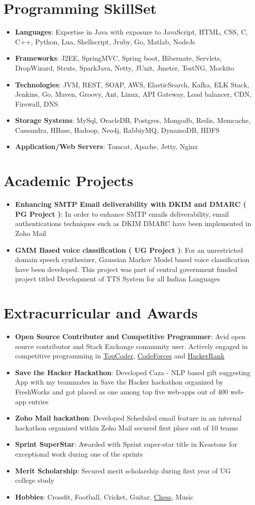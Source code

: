 \documentclass[letterpaper,11pt]{article}
\newcommand{\resumeItem}[2]{
  \item\small{
    \textbf{#1}{: #2 \vspace{-2pt}}
  }
}
\newcommand{\resumeSubItem}[2]{\resumeItem{#1}{#2}\vspace{-4pt}}
\newcommand{\resumeSubHeadingListStart}{\begin{itemize}[leftmargin=*]}
\newcommand{\resumeSubHeadingListEnd}{\end{itemize}}
\begin{document}
\section{Programming SkillSet}
  \resumeSubHeadingListStart
    \resumeSubItem{Languages}{Expertise in Java with exposure to JavaScript, HTML, CSS, C, C++, Python, Lua, Shellscript, Jruby, Go, Matlab, NodeJs}
    \resumeSubItem{Frameworks}{J2EE, SpringMVC, Spring boot, Hibernate, Servlets, DropWizard, Struts, SparkJava, Netty, JUnit, Jmeter, TestNG, Mockito}
    \resumeSubItem{Technologies}{JVM, REST, SOAP, AWS, ElasticSearch, Kafka, ELK Stack, Jenkins, Go, Maven, Groovy, Ant, Linux, API Gateway, Load balancer, CDN, Firewall, DNS}
    \resumeSubItem{Storage Systems}{MySql, OracleDB, Postgres, Mongodb, Redis, Memcache,  Cassandra, HBase, Hadoop, Neo4j, RabbiyMQ, DynamoDB, HDFS}
     \resumeSubItem{Application/Web Servers}{Tomcat, Apache, Jetty, Nginx}
     
  \resumeSubHeadingListEnd


\section{Academic Projects}
  \resumeSubHeadingListStart
    \resumeSubItem{Enhancing SMTP Email deliverability with DKIM and DMARC ( PG Project )}
      {In order to enhance SMTP
emails deliverability, email authentications techniques such as DKIM DMARC have been implemented in Zoho Mail}
    \resumeSubItem{GMM Based voice classification ( UG Project )}
      {For an unrestricted domain speech synthesizer, Gaussian Markov
Model based voice classification have been developed. This project was part of central government funded project titled
Development of TTS System for all Indian Languages}


  \resumeSubHeadingListEnd


\section{Extracurricular and Awards}
  \resumeSubHeadingListStart
    \resumeSubItem{Open Source Contributer and Competitive Programmer}
      {Avid open source contributor and Stack Exchange community user. Actively engaged in competitive programming in \href{}{TopCoder}, \href{}{CodeForces} and \href{}{HackerRank}}
    \resumeSubItem{Save the Hacker Hackathon}
      {Developed Caza - NLP based gift suggesting App with my teammates in Save the
Hacker hackathon organized by FreshWorks and got placed as one among top five web-apps out of 400 web-app entries}
    \resumeSubItem{Zoho Mail hackathon}
      {Developed Scheduled email feature in an internal hackathon organized within Zoho Mail secured first place out of 10 teams}
    \resumeSubItem{Sprint SuperStar}
      {Awarded with Sprint super-star title in Keastone for exceptional work during one of the sprints}
    \resumeSubItem{Merit Scholarship}
      {Secured merit scholarship during first year of UG college study}
      \resumeSubItem{Hobbies}
      {Crossfit, Football, Cricket, Guitar, {\href{https://www.chess.com/member/aarish24}{Chess}}, Music}
  \resumeSubHeadingListEnd

\end{document}
